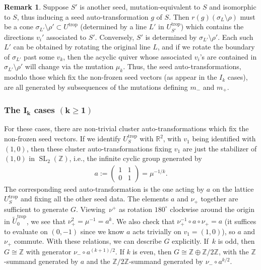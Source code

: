 \documentclass[10pt,a4paper]{amsart}
\numberwithin{equation}{section}
\numberwithin{figure}{section}
\numberwithin{table}{section}
\DeclareMathOperator{\SL}{SL}
\DeclareMathOperator{\trop}{trop}
\let\bb=\mathbb
\let\wt=\widetilde
\theoremstyle{definition}
\newtheorem{rmk}[thm]{Remark}
\begin{document}
\begin{rmk}\label{subseq}Suppose $S'$ is another seed, mutation-equivalent to $S$ and isomorphic to $S$, thus inducing a seed auto-transformation $g$ of $S$. Then $r(g)(\sigma_{L}\setminus \rho)$ must be a cone $\sigma_{L'}\setminus \rho'\subset U^{\trop}$ (determined by a line $L'$ in $U_{S'}^{\trop}$) which contains the directions $v_i'$ associated to $S'$. Conversely, $S'$ is determined by $\sigma_{L'}\setminus \rho'$. Each such $L'$ can be obtained by rotating the original line $L$, and if we rotate the boundary of $\sigma_{L'}$ past some $v_k$, then the acyclic quiver whose associated $v_i$'s are contained in $\sigma_{L'}\setminus \rho'$ will change via the mutation $\mu_k$. Thus, the seed auto-transformations, modulo those which fix the non-frozen seed vectors (as appear in the $I_k$ cases), are all generated by subsequences of the mutations defining $m_-$ and $m_+$.
\end{rmk}

\subsubsection[The $I_k$ cases $(k\geq 1)$]{The $\boldsymbol{I_k}$ cases $\boldsymbol{(k\geq 1)}$}
For these cases, there are non-trivial cluster auto-transformations which fix the non-frozen seed vectors. If we identify $U^{\trop}_S$ with $\bb{R}^2$, with $v_1$ being identified with $(1,0)$, then these cluster auto-transformations fixing $v_1$ are just the stabilizer of $(1,0)$ in $\SL_2(\bb{Z})$, i.e., the infinite cyclic group generated by
\begin{align*}
a:=\left(\begin{matrix} 1 & 1 \\ 0 & 1 \end{matrix} \right)=\mu^{-1/k}.
\end{align*}
The corresponding seed auto-transformation is the one acting by $a$ on the lattice $U^{\trop}_S$ and fixing all the other seed data. The elements $a$ and $\nu_+$ together are sufficient to generate $G$. Viewing~$\nu^+$ as rotation $180^{\circ}$ clockwise around the origin in $\wt{U}_0^{\trop}$, we see that $\nu_+^2 = \mu^{-1}=a^k$. We also check that $\nu_+^{-1}\circ a \circ \nu_+=a$ (it suffices to evaluate on $(0,-1)$ since we know $a$ acts trivially on $v_1=(1,0)$), so $a$ and $\nu_+$ commute. With these relations, we can describe $G$ explicitly. If~$k$ is odd, then $G\cong \bb{Z}$ with generator $\nu_-\circ a^{(k+1)/2}$. If $k$ is even, then $G\cong \bb{Z}\oplus \bb{Z}/2\bb{Z}$, with the $\bb{Z}$-summand generated by $a$ and the $\bb{Z}/2\bb{Z}$-summand generated by $\nu_-\circ a^{k/2}$.
\end{document}
